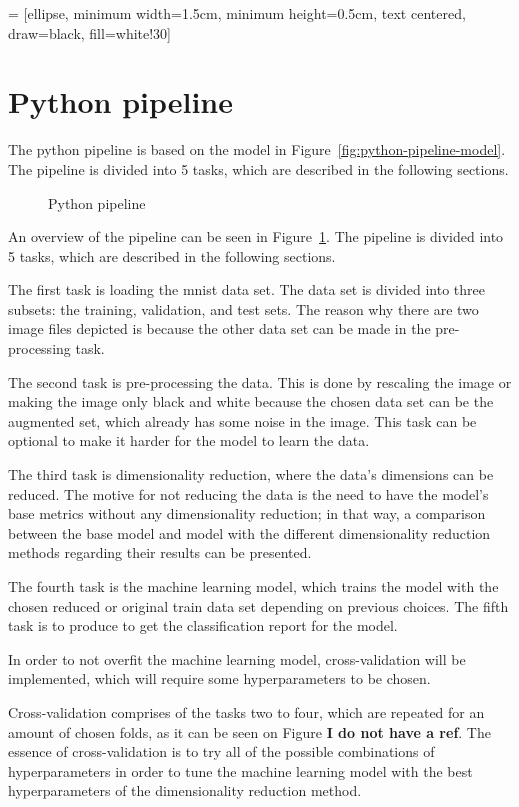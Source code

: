  = [ellipse, minimum width=1.5cm, minimum height=0.5cm, text centered, draw=black, fill=white!30]
\section{Python pipeline}\label{sec:python-pipeline}
The python pipeline is based on the model in Figure~\ref{fig:python-pipeline-model}. The pipeline is divided into 5 tasks, which are described in the following sections. 

\begin{figure}[htb!]
    \centering
    
    \caption{Python pipeline}
    \label{fig:Python-pipeline}
\end{figure}

An overview of the pipeline can be seen in Figure~\ref{fig:Python-pipeline}. The pipeline is divided into 5 tasks, which are described in the following sections. 

The first task is loading the \gls{mnist} data set. The data set is divided into three subsets: the training, validation, and test sets. The reason why there are two image files depicted is because the other data set can be made in the pre-processing task.


The second task is pre-processing the data. This is done by rescaling the image or making the image only black and white because the chosen data set can be the augmented set, which already has some noise in the image. This task can be optional to make it harder for the model to learn the data.


The third task is dimensionality reduction, where the data's dimensions can be reduced. The motive for not reducing the data is the need to have the model's base metrics without any dimensionality reduction; in that way, a comparison between the base model and model with the different dimensionality reduction methods regarding their results can be presented.

The fourth task is the machine learning model, which trains the model with the chosen reduced or original train data set depending on previous choices. The fifth task is to produce to get the classification report for the model.

In order to not overfit the machine learning model, cross-validation will be implemented, which will require some hyperparameters to be chosen.


Cross-validation comprises of the tasks two to four, which are repeated for an amount of chosen folds, as it can be seen on Figure \textbf{I do not have a ref}. The essence of cross-validation is to try all of the possible combinations of hyperparameters in order to tune the machine learning model with the best hyperparameters of the dimensionality reduction method.


